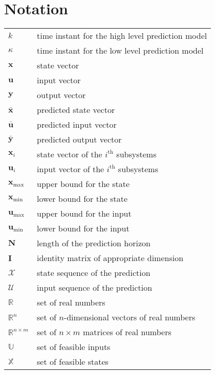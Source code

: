 
\allowdisplaybreaks
\chapter*{\bfseries Notation}
\thispagestyle{empty}
\vspace{-.5em} %
\begin{tabular}{@{} p{\figurelabelwidth} @{} p{\textwidth-\figurelabelwidth}}
$k$ 				 & time instant for the high level prediction model\\
$\kappa$ 			 & time instant for the low level prediction model\\
$\bm{x}$	  		 & state vector\\
$\bm{u}$		  	 & input vector\\
$\bm{y}$		  	 & output vector\\
$\bm{\bar{x}}$  	 & predicted state vector\\
$\bm{\bar{u}}$  	 & predicted input vector\\
$\bm{\bar{y}}$  	 & predicted output vector\\
$\bm{x}_{i}$	 	 & state vector of the $i^{\text{th}}$ subsystems\\
$\bm{u}_{i}$	 	 & input vector of the $i^{\text{th}}$ subsystems\\
$\bm{x}_{\max}$ 	 & upper bound for the state\\
$\bm{x}_{\min}$	 & lower bound for the state\\
$\bm{u}_{\max}$	 & upper bound for the input\\
$\bm{u}_{\min}$ 	 & lower bound for the input\\
$\bm{N}$	 	 	 & length of the prediction horizon\\
$\bm{I}$	 	 	 & identity matrix of appropriate dimension\\
$\mathcal{X}$	  	 & state sequence of the prediction\\
$\mathcal{U}$	 	 & input sequence of the prediction\\
$\mathbb{R}$	  	 & set of real numbers\\
$\mathbb{R}^{n}$& set of $n$-dimensional vectors of real numbers\\
$\mathbb{R}^{n \times m}$ & set of $n \times m$ matrices of real numbers\\
$\mathbb{U}$	  	 & set of feasible inputs\\
$\mathbb{X}$	  	 & set of feasible states\\
\end{tabular}                   
\cleardoublepage

